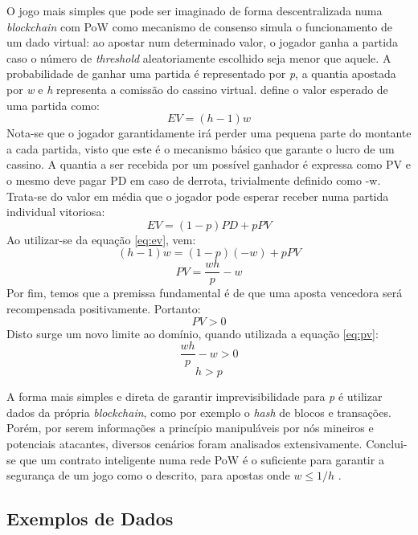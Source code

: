 \documentclass[a4paper,12pt]{monografia}
\theoremstyle{plain}
\theoremstyle{definition}
\theoremstyle{remark}
\begin{document}
O jogo mais simples que pode ser imaginado de forma descentralizada numa \textit{blockchain} com PoW como mecanismo de consenso simula o funcionamento de um dado virtual: ao apostar num determinado valor, o jogador ganha a partida caso o n\'{u}mero de \textit{threshold} aleatoriamente escolhido seja menor que aquele.
A probabilidade de ganhar uma partida \'{e} representado por \textit{p}, a quantia apostada por \textit{w} e \textit{h} representa a comiss\~{a}o do cassino virtual.
 define o valor esperado de uma partida como:
\begin{equation}
EV = (h - 1)w
\label{eq:ev}
\end{equation}
Nota-se que o jogador garantidamente ir\'{a} perder uma pequena parte do montante a cada partida, visto que este \'{e} o mecanismo b\'{a}sico que garante o lucro de um cassino.
A quantia a ser recebida por um poss\'{i}vel ganhador \'{e} expressa como PV e o mesmo deve pagar PD em caso de derrota, trivialmente definido como -w.
Trata-se do valor em m\'{e}dia que o jogador pode esperar receber numa partida individual vitoriosa:
$$
EV=(1-p)PD+pPV
$$
Ao utilizar-se da equa\c{c}\~{a}o \ref{eq:ev}, vem:
$$
(h-1)w=(1-p)(-w)+pPV
$$
\begin{equation}
PV=\frac{wh}{p}-w
\label{eq:pv}
\end{equation}
Por fim, temos que a premissa fundamental \'{e} de que uma aposta vencedora ser\'{a} recompensada positivamente.
Portanto:
$$
PV>0
$$
Disto surge um novo limite ao dom\'{i}nio, quando utilizada a equa\c{c}\~{a}o \ref{eq:pv}:
$$
\frac{wh}{p}-w>0
$$
\begin{equation}
h>p
\label{eq:hp}
\end{equation}

A forma mais simples e direta de garantir imprevisibilidade para \textit{p} \'{e} utilizar dados da pr\'{o}pria \textit{blockchain}, como por exemplo o \textit{hash} de blocos e transa\c{c}\~{o}es.
Por\'{e}m, por serem informa\c{c}\~{o}es a princ\'{i}pio manipul\'{a}veis por n\'{o}s mineiros e potenciais atacantes, diversos cen\'{a}rios foram analisados extensivamente.
Conclui-se que um contrato inteligente numa rede PoW \'{e} o suficiente para garantir a seguran\c{c}a de um jogo como o descrito, para apostas onde $w \leq 1/h$ \cite{provablyfair}. 

\subsection{Exemplos de Dados}
\end{document}
